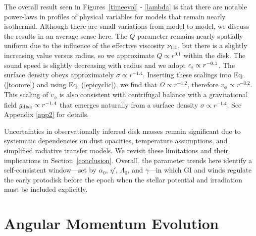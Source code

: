 \documentclass[twocolumn,linenumbers]{aastex631}
\begin{document}

The overall result seen in Figures~\ref{timeevol} - \ref{lambda} is that there are notable power-laws in profiles of physical variables for models that remain nearly isothermal. Although there are small variations from model to model, we discuss the results in an average sense here. The $Q$ parameter remains nearly spatially uniform due to
the influence of the effective viscosity $\nu_{\rm GI}$,
but there is a slightly increasing value versus radius, so we approximate $Q \propto r^{0.1}$ within the disk. The sound speed is slightly decreasing with radius and we adopt $c_{\rm s} \propto r^{-0.1}$. The surface density obeys approximately $\sigma \propto r^{-1.4}$. Inserting these scalings into Eq. (\ref{toomre}) and using Eq. (\ref{epicyclic}), we find that $\Omega \propto r^{-1.2}$, therefore $v_\phi \propto r^{-0.2}$. This scaling of $v_\phi$ is also consistent with centrifugal balance with a gravitational field $g_{\rm disk} \propto r^{-1.4}$ that emerges naturally from a surface density $\sigma \propto r^{-1.4}$. See Appendix \ref{app2} for details. 

Uncertainties in observationally inferred disk masses remain significant due to systematic dependencies on dust opacities, temperature assumptions, and simplified radiative transfer models. We revisit these limitations and their implications in Section~\ref{conclusion}. Overall, the parameter trends here identify a self-consistent window—set by $\alpha_0$, $\eta'$, $\Lambda_0$, and $\gamma$—in which GI and winds regulate the early protodisk before the epoch when the stellar potential and irradiation must be included explicitly.



\section{Angular Momentum Evolution}\label{angmom}

\end{document}
